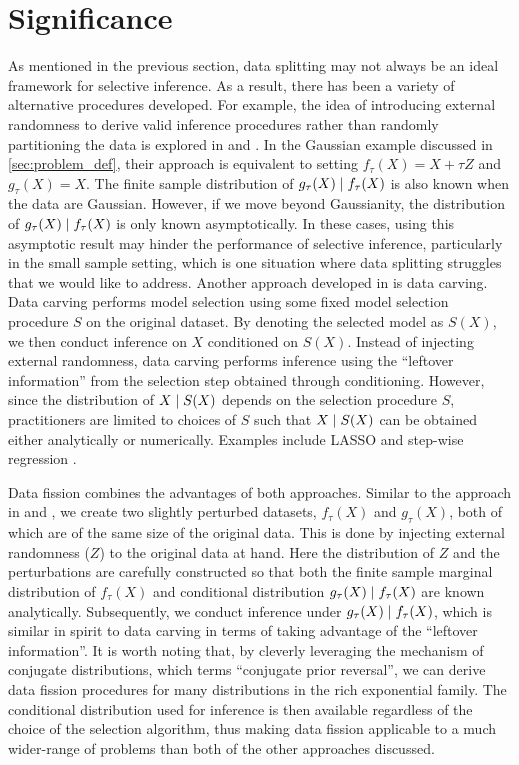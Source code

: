 \section{Significance}
As mentioned in the previous section, data splitting may not always be an ideal framework for selective inference. As a result, there has been a variety of alternative procedures developed. For example, the idea of introducing external randomness to derive valid inference procedures rather than randomly partitioning the data is explored in \cite{tian2018selective} and \cite{rasines2021splitting}. In the Gaussian example discussed in \cref{sec:problem_def}, their approach is equivalent to setting $f_\tau(X) = X+\tau Z$ and $g_\tau(X) = X$. The finite sample distribution of $g_\tau(X) \mid f_\tau(X)$ is also known when the data are Gaussian. However, if we move beyond Gaussianity, the distribution of $g_\tau(X) \mid f_\tau(X)$ is only known asymptotically. In these cases, using this asymptotic result may hinder the performance of selective inference, particularly in the small sample setting, which is one situation where data splitting struggles that we would like to address. Another approach developed in \cite{fithian2014optimal} is data carving. Data carving performs model selection using some fixed model selection procedure $S$ on the original dataset. By denoting the selected model as $S(X)$, we then conduct inference on $X$ conditioned on $S(X)$. Instead of injecting external randomness, data carving performs inference using the ``leftover information'' from the selection step obtained through conditioning. However, since the distribution of $X\mid S(X)$ depends on the selection procedure $S$, practitioners are limited to choices of $S$ such that $X\mid S(X)$ can be obtained either analytically or numerically. Examples include LASSO \citep{lee2016exact} and step-wise regression \citep{tibshirani2016exact}.

Data fission combines the advantages of both approaches. Similar to the approach in \cite{tian2018selective} and \cite{rasines2021splitting}, we create two slightly perturbed datasets, $f_\tau(X)$ and $g_\tau(X)$, both of which are of the same size of the original data. This is done by injecting external randomness ($Z$) to the original data at hand. Here the distribution of $Z$ and the perturbations are carefully constructed so that both the finite sample marginal distribution of $f_\tau(X)$ and conditional distribution $g_\tau(X)\mid f_\tau(X)$ are known analytically. Subsequently, we conduct inference under $g_\tau(X)\mid f_\tau(X)$, which is similar in spirit to data carving in terms of taking advantage of the ``leftover information''. It is worth noting that, by cleverly leveraging the mechanism of conjugate distributions, which \cite{leiner2022data} terms ``conjugate prior reversal'', we can derive data fission procedures for many distributions in the rich exponential family. The conditional distribution used for inference is then available regardless of the choice of the selection algorithm, thus making data fission applicable to a much wider-range of problems than both of the other approaches discussed.


